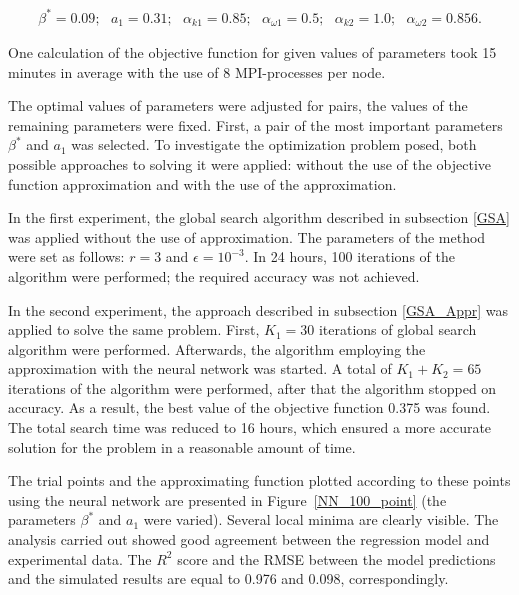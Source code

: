 \documentclass[mathematics,article,submit,pdftex,moreauthors]{Definitions/mdpi}
\begin{document}
\begin{linenomath}
\begin{equation}
	\begin{aligned}
		\beta^* = 0.09;\ \ \ a_1 = 0.31;\ \ \ \alpha_{k 1} = 0.85;\ \ \ \alpha_{\omega 1} = 0.5; \ \ \ \alpha_{k 2} = 1.0;\ \ \ \alpha_{\omega 2} = 0.856.
	\end{aligned}
\end{equation}
\end{linenomath}

One calculation of the objective function for given values of parameters took 15 minutes in average with the use of 8 MPI-processes per node. 

The optimal values of parameters were adjusted for pairs, the values of the remaining parameters were fixed. 
First, a pair of the most important parameters $\beta^*$ and $a_1$ was selected. 
To investigate the optimization problem posed, both possible approaches to solving it were applied: without the use of the objective function approximation  and with the use of the approximation.

In the first experiment, the global search algorithm described in subsection \ref{GSA} was applied without the use of approximation. 
The parameters of the method were set as follows: $r = 3$ and $\epsilon = 10^{-3}$. 
In 24 hours, 100 iterations of the algorithm were performed; the required accuracy was not achieved. 

In the second experiment, the approach described in subsection \ref{GSA_Appr} was applied to solve the same problem.
First, $K_1 = 30$ iterations of global search algorithm were performed. 
Afterwards, the algorithm employing the approximation with the neural network was started. 
A total of $K_1 + K_2 = 65$ iterations of the algorithm were performed, after that the algorithm stopped on accuracy. 
As a result, the best value  of the objective function 0.375 was found. 
The total search time was reduced to 16 hours, which ensured a more accurate solution for the problem in a reasonable amount of time.

The trial points and the approximating function plotted according to these points using the neural network are presented in Figure~\ref{NN_100_point} (the parameters $\beta^*$ and $a_1$ were varied). Several local minima are clearly visible.
The analysis carried out showed good agreement between the regression model and experimental data.
The $R^2$ score and the RMSE between the model predictions and the simulated results are equal to 0.976 and 0.098, correspondingly.
\end{document}
